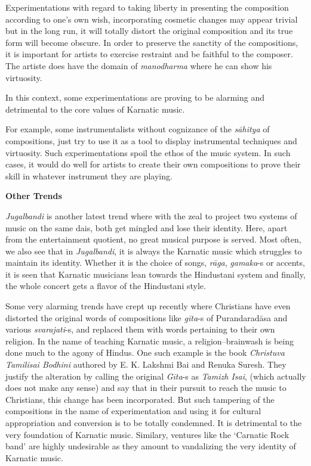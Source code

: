 Experimentations with regard to taking liberty in presenting the composition according to one’s own wish, incorporating cosmetic changes may appear trivial but in the long run, it will totally distort the original composition and its true form will become obscure. In order to preserve the sanctity of the compositions, it is important for artists to exercise restraint and be faithful to the composer. The artiste does have the domain of \textit{manodharma} where he can show his virtuosity.

In this context, some experimentations are proving to be alarming and detrimental to the core values of Karnatic music.

For example, some instrumentalists without cognizance of the \textit{sāhitya} of compositions, just try to use it as a tool to display instrumental techniques and virtuosity. Such experimentations spoil the ethos of the music system. In such cases, it would do well for artists to create their own compositions to prove their skill in whatever instrument they are playing.

\textbf{Other Trends}

\textit{Jugalbandi} is another latest trend where with the zeal to project two systems of music on the same dais, both get mingled and lose their identity. Here, apart from the entertainment quotient, no great musical purpose is served. Most often, we also see that in \textit{Jugalbandi}, it is always the Karnatic music which struggles to maintain its identity. Whether it is the choice of songs, \textit{rāga}, \textit{gamaka}-s or accents, it is seen that Karnatic musicians lean towards the Hindustani system and finally, the whole concert gets a flavor of the Hindustani style.

Some very alarming trends have crept up recently where Christians have even distorted the original words of compositions like \textit{gīta}-s of Purandaradāsa and various \textit{svarajati}-s, and replaced them with words pertaining to their own religion. In the name of teaching Karnatic music, a religion–brainwash is being done much to the agony of Hindus. One such example is the book \textit{Christuva Tamilisai Bodhini} authored by E. K. Lakshmi Bai and Renuka Suresh. They justify the alteration by calling the original \textit{Gīta}-s as \textit{Tamizh Isai}, (which actually does not make any sense) and say that in their pursuit to reach the music to Christians, this change has been incorporated. But such tampering of the compositions in the name of experimentation and using it for cultural appropriation and conversion is to be totally condemned. It is detrimental to the very foundation of Karnatic music. Similary, ventures like the ‘Carnatic Rock band’ are highly undesirable as they amount to vandalizing the very identity of Karnatic music.

